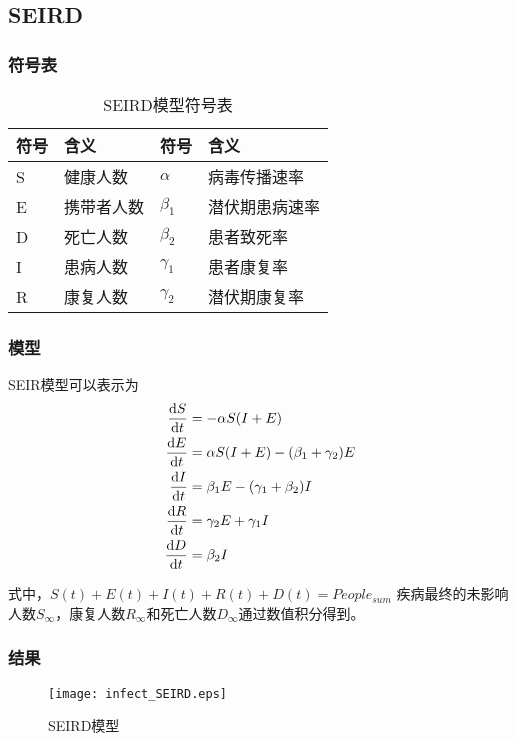 \subsection{SEIRD}
\subsubsection{符号表}
	\begin{table}[H]
	\centering
	\label{table:SEIRD模型符号表}
	\caption{SEIRD模型符号表}
	\begin{tabular}{llll}
		\hline
		符号&含义&符号&含义\\
		\hline
		S&健康人数&$\alpha$&病毒传播速率\\
		E&携带者人数&$\beta_1$&潜伏期患病速率\\
		D&死亡人数&$\beta_2$&患者致死率\\
		I&患病人数&$\gamma_1$&患者康复率\\
		R&康复人数&$\gamma_2$&潜伏期康复率\\
		\hline
	\end{tabular}
	\end{table}
\subsubsection{模型}
	SEIR模型可以表示为
	\begin{align}
		\frac{\mathrm{d}S}{\mathrm{d}t}&=-\alpha S(I+E) \\
		\frac{\mathrm{d}E}{\mathrm{d}t}&=\alpha S(I+E)-(\beta_1+\gamma_2)E \\
		\frac{\mathrm{d}I}{\mathrm{d}t}&=\beta_1E-(\gamma_1+\beta_2)I \\
		\frac{\mathrm{d}R}{\mathrm{d}t}&=\gamma_2E+\gamma_1I \\
		\frac{\mathrm{d}D}{\mathrm{d}t}&=\beta_2I
	\end{align}
	\par 式中，$S(t)+E(t)+I(t)+R(t)+D(t)=People_{sum}$
	疾病最终的未影响人数$S_\infty$，康复人数$R_\infty$和死亡人数$D_\infty$通过数值积分得到。
\subsubsection{结果}
	\begin{figure}[H]
		\centering
		\texttt{[image: infect\_SEIRD.eps]}
		\caption{SEIRD模型}
	\end{figure}
	